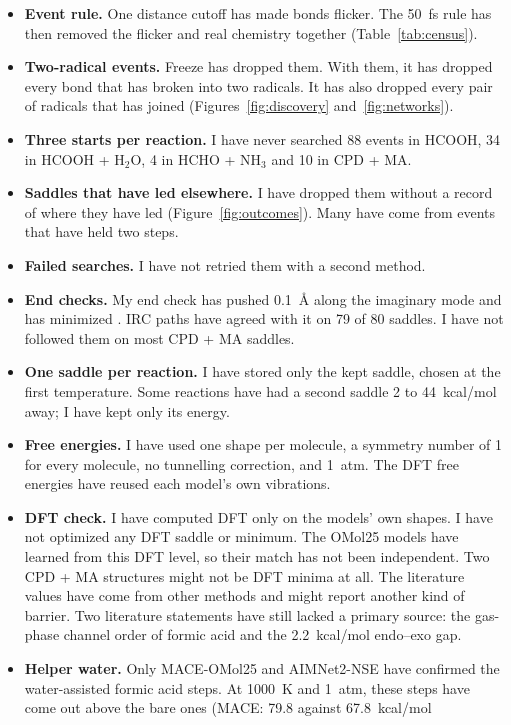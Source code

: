 \documentclass[11pt]{article}
\newcommand{\kcal}{kcal/mol}
\begin{document}
\begin{itemize}
\item \textbf{Event rule.} One distance cutoff has made bonds flicker. The
50~fs rule has then removed the flicker and real chemistry together
(Table~\ref{tab:census}).
\item \textbf{Two-radical events.} Freeze has dropped them. With them, it
has dropped every bond that has broken into two radicals. It has also
dropped every pair of radicals that has joined (Figures~\ref{fig:discovery}
and~\ref{fig:networks}).
\item \textbf{Three starts per reaction.} I have never searched 88 events
in HCOOH, 34 in HCOOH + H$_2$O, 4 in HCHO + NH$_3$ and 10 in CPD + MA.
\item \textbf{Saddles that have led elsewhere.} I have dropped them without
a record of where they have led (Figure~\ref{fig:outcomes}). Many have come
from events that have held two steps.
\item \textbf{Failed searches.} I have not retried them with a second
method.
\item \textbf{End checks.} My end check has pushed 0.1~\AA{} along the
imaginary mode and has minimized \cite{qrc}. IRC paths have agreed with it
on 79 of 80 saddles. I have not followed them on most CPD + MA saddles.
\item \textbf{One saddle per reaction.} I have stored only the kept saddle,
chosen at the first temperature. Some reactions have had a second saddle 2
to 44~\kcal{} away; I have kept only its energy.
\item \textbf{Free energies.} I have used one shape per molecule, a
symmetry number of 1 for every molecule, no tunnelling correction, and
1~atm. The DFT free energies have reused each model's own vibrations.
\item \textbf{DFT check.} I have computed DFT only on the models' own
shapes. I have not optimized any DFT saddle or minimum. The OMol25 models
have learned from this DFT level, so their match has not been independent.
Two CPD + MA structures might not be DFT minima at all. The literature
values have come from other methods and might report another kind of
barrier. Two literature statements have still lacked a primary source: the
gas-phase channel order of formic acid and the 2.2~\kcal{} endo--exo gap.
\item \textbf{Helper water.} Only MACE-OMol25 and AIMNet2-NSE have
confirmed the water-assisted formic acid steps. At 1000~K and 1~atm, these
steps have come out above the bare ones (MACE: 79.8 against 67.8~\kcal{}

\end{itemize}
\end{document}
